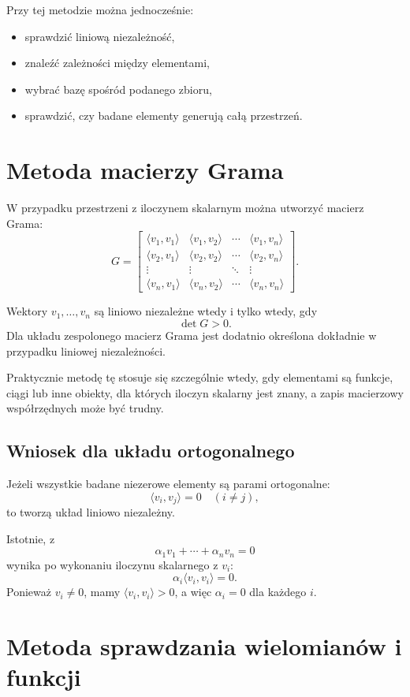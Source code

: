 \documentclass{article}
\begin{document}
Przy tej metodzie można jednocześnie:
\begin{itemize}
    \item sprawdzić liniową niezależność,
    \item znaleźć zależności między elementami,
    \item wybrać bazę spośród podanego zbioru,
    \item sprawdzić, czy badane elementy generują całą przestrzeń.
\end{itemize}

\section{Metoda macierzy Grama}

W przypadku przestrzeni z iloczynem skalarnym można utworzyć macierz Grama:
\[
G=
\begin{bmatrix}
\langle v_1,v_1\rangle & \langle v_1,v_2\rangle & \cdots & \langle v_1,v_n\rangle\\
\langle v_2,v_1\rangle & \langle v_2,v_2\rangle & \cdots & \langle v_2,v_n\rangle\\
\vdots & \vdots & \ddots & \vdots\\
\langle v_n,v_1\rangle & \langle v_n,v_2\rangle & \cdots & \langle v_n,v_n\rangle
\end{bmatrix}.
\]

Wektory $v_1,\ldots,v_n$ są liniowo niezależne wtedy i tylko wtedy, gdy
\[
\det G>0.
\]
Dla układu zespolonego macierz Grama jest dodatnio określona dokładnie w przypadku liniowej niezależności.

Praktycznie metodę tę stosuje się szczególnie wtedy, gdy elementami są funkcje, ciągi lub inne obiekty, dla których iloczyn skalarny jest znany, a zapis macierzowy współrzędnych może być trudny.

\subsection{Wniosek dla układu ortogonalnego}
Jeżeli wszystkie badane niezerowe elementy są parami ortogonalne:
\[
\langle v_i,v_j\rangle=0 \quad (i\neq j),
\]
to tworzą układ liniowo niezależny.

Istotnie, z
\[
\alpha_1v_1+\cdots+\alpha_nv_n=0
\]
wynika po wykonaniu iloczynu skalarnego z $v_i$:
\[
\alpha_i\langle v_i,v_i\rangle=0.
\]
Ponieważ $v_i\neq0$, mamy $\langle v_i,v_i\rangle>0$, a więc $\alpha_i=0$ dla każdego $i$.

\section{Metoda sprawdzania wielomianów i funkcji}
\end{document}
